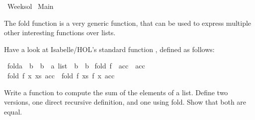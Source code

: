 %
\begin{isabellebody}%
%
%
\isadelimtheory
\isanewline
%
\endisadelimtheory
%
\isatagtheory
{}\isamarkupfalse%
\ Week{\isacharunderscore}{\kern0pt}{}{\isacharunderscore}{\kern0pt}sol\isanewline
{}\ Main\isanewline
{}%
\endisatagtheory
{\isafoldtheory}%
%
\isadelimtheory
%
\endisadelimtheory
%
\begin{isamarkuptext}%
\vspace{15ex}%
\end{isamarkuptext}\isamarkuptrue%
%
\begin{isamarkuptext}%
  The fold function is a very generic function, that can be used to express 
  multiple other interesting functions over lists.%
\end{isamarkuptext}\isamarkuptrue%
%
\begin{isamarkuptext}%
Have a look at Isabelle/HOL's standard function , defined as follows:%
\end{isamarkuptext}\isamarkuptrue%
\isamarkupfalse%
\ fold{\isacharcolon}{\kern0pt}{\isacharcolon}{\kern0pt}{\isachardoublequoteopen}{\isacharparenleft}{\kern0pt}{\isacharprime}{\kern0pt}a\ {\isasymRightarrow}\ {\isacharprime}{\kern0pt}b\ {\isasymRightarrow}\ {\isacharprime}{\kern0pt}b{\isacharparenright}{\kern0pt}\ {\isasymRightarrow}\ {\isacharprime}{\kern0pt}a\ list\ {\isasymRightarrow}\ {\isacharprime}{\kern0pt}b\ {\isasymRightarrow}\ {\isacharprime}{\kern0pt}b{\isachardoublequoteclose}\ \isanewline
{\isachardoublequoteopen}fold\ f\ {\isacharbrackleft}{\kern0pt}{\isacharbrackright}{\kern0pt}\ acc\ {\isacharequal}{\kern0pt}\ acc{\isachardoublequoteclose}\isanewline
{\isacharbar}{\kern0pt}\ {\isachardoublequoteopen}fold\ f\ {\isacharparenleft}{\kern0pt}x\ {\isacharhash}{\kern0pt}xs{\isacharparenright}{\kern0pt}\ acc\ {\isacharequal}{\kern0pt}\ fold\ f\ xs\ {\isacharparenleft}{\kern0pt}f\ x\ acc{\isacharparenright}{\kern0pt}{\isachardoublequoteclose}%
\begin{isamarkuptext}%
Write a function to compute the sum of the elements of a list. 
  Define two versions, one direct recursive definition, and one using fold.
  Show that both are equal.


\end{isamarkuptext}
\end{isabellebody}
